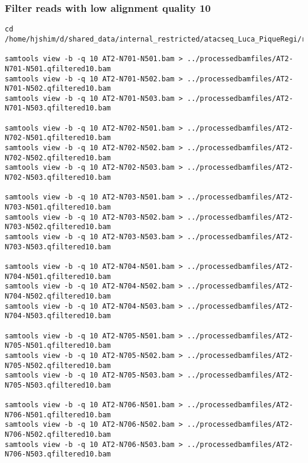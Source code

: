 \documentclass[11pt]{article}
\begin{document}
\subsubsection{Filter reads with low alignment quality 10}
\label{sec-2-3-2}
\begin{lstlisting}
cd /home/hjshim/d/shared_data/internal_restricted/atacseq_Luca_PiqueRegi/rawbamfiles/

samtools view -b -q 10 AT2-N701-N501.bam > ../processedbamfiles/AT2-N701-N501.qfiltered10.bam
samtools view -b -q 10 AT2-N701-N502.bam > ../processedbamfiles/AT2-N701-N502.qfiltered10.bam
samtools view -b -q 10 AT2-N701-N503.bam > ../processedbamfiles/AT2-N701-N503.qfiltered10.bam

samtools view -b -q 10 AT2-N702-N501.bam > ../processedbamfiles/AT2-N702-N501.qfiltered10.bam
samtools view -b -q 10 AT2-N702-N502.bam > ../processedbamfiles/AT2-N702-N502.qfiltered10.bam
samtools view -b -q 10 AT2-N702-N503.bam > ../processedbamfiles/AT2-N702-N503.qfiltered10.bam

samtools view -b -q 10 AT2-N703-N501.bam > ../processedbamfiles/AT2-N703-N501.qfiltered10.bam
samtools view -b -q 10 AT2-N703-N502.bam > ../processedbamfiles/AT2-N703-N502.qfiltered10.bam
samtools view -b -q 10 AT2-N703-N503.bam > ../processedbamfiles/AT2-N703-N503.qfiltered10.bam

samtools view -b -q 10 AT2-N704-N501.bam > ../processedbamfiles/AT2-N704-N501.qfiltered10.bam
samtools view -b -q 10 AT2-N704-N502.bam > ../processedbamfiles/AT2-N704-N502.qfiltered10.bam
samtools view -b -q 10 AT2-N704-N503.bam > ../processedbamfiles/AT2-N704-N503.qfiltered10.bam

samtools view -b -q 10 AT2-N705-N501.bam > ../processedbamfiles/AT2-N705-N501.qfiltered10.bam
samtools view -b -q 10 AT2-N705-N502.bam > ../processedbamfiles/AT2-N705-N502.qfiltered10.bam
samtools view -b -q 10 AT2-N705-N503.bam > ../processedbamfiles/AT2-N705-N503.qfiltered10.bam

samtools view -b -q 10 AT2-N706-N501.bam > ../processedbamfiles/AT2-N706-N501.qfiltered10.bam
samtools view -b -q 10 AT2-N706-N502.bam > ../processedbamfiles/AT2-N706-N502.qfiltered10.bam
samtools view -b -q 10 AT2-N706-N503.bam > ../processedbamfiles/AT2-N706-N503.qfiltered10.bam
\end{lstlisting}
\end{document}
